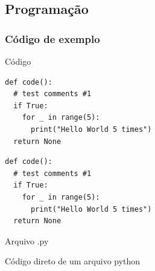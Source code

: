 \documentclass[table,xcolor=table]{apresentações/exemplo 2/IFMG-beamer}
\begin{document}
\subsection{Programação}
\begin{frame}[fragile]

\frametitle{Código de exemplo}



\begin{block}{Código}
\begin{lstlisting}
def code():
  # test comments #1    
  if True:
    for _ in range(5):
      print("Hello World 5 times")
  return None     
\end{lstlisting}
\end{block}

\begin{lstlisting}[backgroundcolor = \color{lightgray}]
def code():
  # test comments #1    
  if True:
    for _ in range(5):
      print("Hello World 5 times")
  return None     
\end{lstlisting}

\end{frame}


\begin{frame}{Arquivo .py}
    \begin{block}{Código direto de um arquivo python}
        \inputminted{python}{codigos/codigo.py}
    \end{block}
    
\end{frame}
\end{document}
